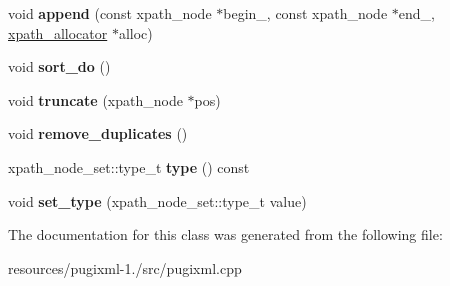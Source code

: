 \begin{DoxyCompactItemize}
\item 
\hypertarget{classxpath__node__set__raw_a0c02728de3d895a2d12df9666d60e414}{void {\bfseries append} (const xpath\+\_\+node $\ast$begin\+\_\+, const xpath\+\_\+node $\ast$end\+\_\+, \hyperlink{classxpath__allocator}{xpath\+\_\+allocator} $\ast$alloc)}\label{classxpath__node__set__raw_a0c02728de3d895a2d12df9666d60e414}

\item 
\hypertarget{classxpath__node__set__raw_a5e46ee306afc24ea83f6c1181bba3600}{void {\bfseries sort\+\_\+do} ()}\label{classxpath__node__set__raw_a5e46ee306afc24ea83f6c1181bba3600}

\item 
\hypertarget{classxpath__node__set__raw_aba48d228f554065702f3e6d5059f701d}{void {\bfseries truncate} (xpath\+\_\+node $\ast$pos)}\label{classxpath__node__set__raw_aba48d228f554065702f3e6d5059f701d}

\item 
\hypertarget{classxpath__node__set__raw_af82da6fa8d42f9dff9c55e7b93d96e26}{void {\bfseries remove\+\_\+duplicates} ()}\label{classxpath__node__set__raw_af82da6fa8d42f9dff9c55e7b93d96e26}

\item 
\hypertarget{classxpath__node__set__raw_a9c1dceb2d9a8e0747380bd12968fc9d8}{xpath\+\_\+node\+\_\+set\+::type\+\_\+t {\bfseries type} () const }\label{classxpath__node__set__raw_a9c1dceb2d9a8e0747380bd12968fc9d8}

\item 
\hypertarget{classxpath__node__set__raw_ae73780271d772967f78ddd7b9376cdab}{void {\bfseries set\+\_\+type} (xpath\+\_\+node\+\_\+set\+::type\+\_\+t value)}\label{classxpath__node__set__raw_ae73780271d772967f78ddd7b9376cdab}

\end{DoxyCompactItemize}


The documentation for this class was generated from the following file\+:\begin{DoxyCompactItemize}
\item 
resources/pugixml-\/1./src/pugixml.\+cpp\end{DoxyCompactItemize}
